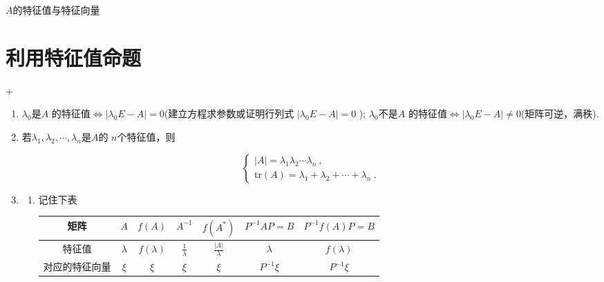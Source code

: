  $A$的特征值与特征向量

\section{利用特征值命题}
\DOne +\DTwoTwo
\begin{enumerate}
    \item $\lambda_0$是$A$ 的特征值$\Leftrightarrow|\lambda_0E-A|=0$(建立方程求参数或证明行列式 $|\lambda_0E-A|=0$ );
          $\lambda_0$不是$A$ 的特征值$\Leftrightarrow|\lambda_0E-A|\neq0$(矩阵可逆，满秩).
    \item 若$\lambda_1,\lambda_2,\cdots,\lambda_n$是$A$的 $n$个特征值，则

          $$\begin{cases}|A|=\lambda_1\lambda_2\cdots\lambda_n\:,\\\mathrm{tr}\left(A\right)=\lambda_1+\lambda_2+\cdots+\lambda_n\:.\end{cases}$$
    \item \begin{enumerate}
              \item 记住下表
                    \begin{table}[h]
                        \centering
                        \begin{tabular}{|c|c|c|c|c|c|c|}
                            \hline
                            矩阵      & $A$       & $f(A)$       & $A^{-1}$            & $f(A^*)$               & $P^{-1}AP=B$ & $P^{-1}f(A)P=B$ \\
                            \hline
                            特征值     & $\lambda$ & $f(\lambda)$ & $\frac{1}{\lambda}$ & $\frac{|A|}{\lambda} $ & $\lambda$    & $f(\lambda)$    \\
                            \hline
                            对应的特征向量 & $\xi$     & $\xi$        & $\xi$               & $\xi$                  & $P^{-1}\xi$  & $P^{-1}\xi$     \\
                            \hline
                        \end{tabular}
                    \end{table}


\end{enumerate}
\end{enumerate}
